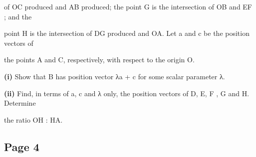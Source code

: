 \documentclass[12pt]{article}
\begin{document}
\begin{flushleft}
of OC produced and AB produced; the point G is the intersection of OB and EF ; and the\par
point H is the intersection of DG produced and OA. Let a and c be the position vectors of\par
the points A and C, respectively, with respect to the origin O.\par
\textbf{(i)} Show that B has position vector λa + c for some scalar parameter λ.\par
\textbf{(ii)} Find, in terms of a, c and λ only, the position vectors of D, E, F , G and H. Determine\par
the ratio OH : HA.\par
\end{flushleft}
\subsection*{Page 4}
\end{document}
